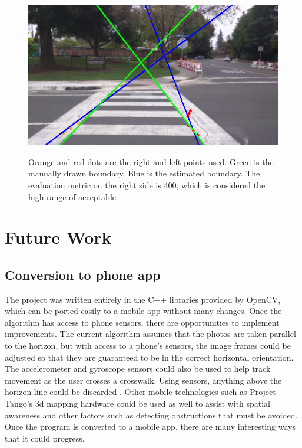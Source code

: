 \documentclass[12pt]{ucthesis}
\newcommand{\captionfonts}{\small\bf\ssp}
\begin{document}
\begin{figure}[t]
\begin{center}
\includegraphics[width=12cm]{400RightSide.png}
\captionfonts
\caption[Upper Limit of Boundary Line Metric]{Orange and red dots are the right and left points used. Green is the manually drawn boundary. Blue is the estimated boundary. The evaluation metric on the right side is 400, which is considered the high range of acceptable}
\label{fig:400Metric}
\end{center}
\end{figure}


\chapter{Future Work}
\label{future work}

\section{Conversion to phone app}

The project was written entirely in the C++ libraries provided by OpenCV, which can be ported easily to a mobile app without many changes. Once the algorithm has access to phone sensors, there are opportunities to implement improvements. The current algorithm assumes that the photos are taken parallel to the horizon, but with access to a phone's sensors, the image frames could be adjusted so that they are guaranteed to be in the correct horizontal orientation. The accelerometer and gyroscope sensors could also be used to help track movement as the user crosses a crosswalk. Using sensors, anything above the horizon line could be discarded \cite{Crosswatch2Lane}. Other mobile technologies such as Project Tango's 3d mapping hardware \cite{projectTango} could be used as well to assist with spatial awareness and other factors such as detecting obstructions that must be avoided. Once the program is converted to a mobile app, there are many interesting ways that it could progress.
\end{document}

